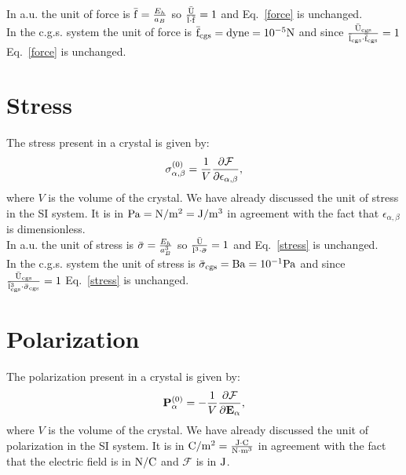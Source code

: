 \documentclass[12pt,a4paper,twoside]{report}
\begin{document}
{\color{web-blue} In a.u. the unit of force is 
${\rm \bar f}= {E_h \over a_B}$ so ${{\rm \bar U} \over {\rm \bar l}\cdot {\rm \bar f}}=1$ and
Eq.~\ref{force} is unchanged.
}
\\

{\color{orange} In the c.g.s. system the unit of force 
is ${\rm \bar f_{cgs}}={\rm dyne}=10^{-5} {\rm N}$ and since ${{\rm \bar U_{cgs}} \over 
{\rm \bar l_{cgs}} \cdot {\rm \bar f_{cgs}}}=1$ Eq.~\ref{force} is unchanged.
\\
}

\newpage
{\color{coral}\section{Stress}}
\color{black}

The stress present in a crystal is given by:
\begin{equation}
{\sigma}^{(0)}_{\alpha,\beta}={1\over V} 
{\partial \mathcal{F} \over \partial \epsilon_{\alpha,\beta}},
\label{stress}
\end{equation}
where $V$ is the volume of the crystal.
We have already discussed the unit of stress in the SI system. It is
in ${\rm Pa}={\rm N}/{\rm m}^2={\rm J}/{\rm m}^3$ in agreement with the 
fact that $\epsilon_{\alpha,\beta}$ is dimensionless.
\\

{\color{web-blue} In a.u. the unit of stress is 
${\rm \bar \sigma}= {E_h \over a_B^3}$ so ${{\rm \bar U} \over {\rm \bar l}^3 \cdot {\rm \bar \sigma}}=1$ and
Eq.~\ref{stress} is unchanged.
}
\\

{\color{orange} In the c.g.s. system the unit of stress
is ${\rm \bar \sigma_{cgs}}={\rm Ba}=10^{-1} {\rm Pa}$ and since ${{\rm \bar U_{cgs}} \over 
{\rm \bar l_{cgs}}^3 \cdot {\rm \bar \sigma_{cgs}}}=1$ Eq.~\ref{stress} is unchanged.
\\
}

\newpage
{\color{coral}\section{Polarization}}
\color{black}

The polarization present in a crystal is given by:
\begin{equation}
{\bf P}^{(0)}_{\alpha}=-{1\over V} 
{\partial \mathcal{F} \over \partial {\bf E}_{\alpha}},
\label{polarization}
\end{equation}
where $V$ is the volume of the crystal.
We have already discussed the unit of polarization in the SI system. It is
in ${\rm C}/{\rm m}^2={{\rm J}\cdot {\rm C} \over {\rm N}\cdot {\rm m}^3}$ in agreement with the fact that the
electric field is in ${\rm N}/{\rm C}$ and $\mathcal{F}$ is in ${\rm J}$.
\\
\end{document}
